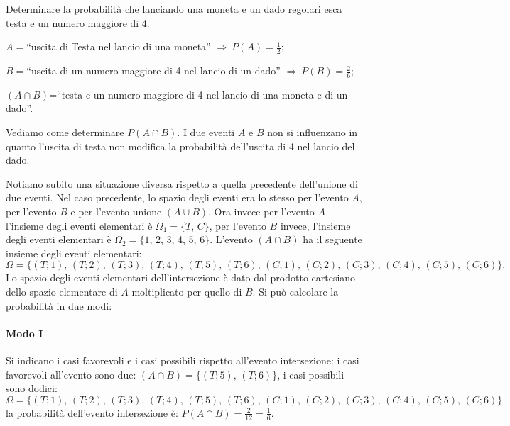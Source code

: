 \begin{exrig}
\begin{esempio}
Determinare la probabilità che lanciando una moneta e un dado regolari esca testa e un numero maggiore di 4.
\begin{description*}
\item $A=$``uscita di Testa nel lancio di una moneta'' $\Rightarrow\: P(A)=\frac 1 2$;
\item $B=$``uscita di un numero maggiore di 4 nel lancio di un dado'' $\Rightarrow\: P(B)=\frac 2 6$;
\item $(A\cap B)$=``testa e un numero maggiore di 4 nel lancio di una moneta e di un dado''.
\end{description*}
Vediamo come determinare $P(A\cap B)$.
I due eventi $A$ e $B$ non si influenzano in quanto l'uscita di testa non modifica la probabilità dell'uscita di 4 nel lancio del dado.

Notiamo subito una situazione diversa rispetto a quella precedente dell'unione di due eventi. Nel caso precedente, lo spazio degli eventi era lo stesso per l'evento $A$, per l'evento $B$ e per l'evento unione $(A\cup B)$.
Ora invece per l'evento $A$ l'insieme degli eventi elementari è $\Omega_1=\{T$, $C\}$, per l'evento $B$ invece, l'insieme degli eventi elementari è $\Omega_2=\{1$, 2, 3, 4, 5, $6\}$. L'evento $(A\cap B)$ ha il seguente insieme degli eventi elementari: \[\Omega=\{(T;1)\text{, }(T;2)\text{, }(T;3)\text{, }(T;4)\text{, }(T;5)\text{, }(T;6)\text{, }(C;1)\text{, }(C;2)\text{, }(C;3)\text{, }(C;4)\text{, }(C;5)\text{, }(C;6)\}. \]
Lo spazio degli eventi elementari dell'intersezione è dato dal prodotto cartesiano dello spazio elementare di $A$ moltiplicato per quello di $B$. Si può calcolare la probabilità in due modi:
\paragraph{Modo I} Si indicano i casi favorevoli e i casi possibili rispetto all'evento intersezione: i casi favorevoli all'evento sono due: $(A\cap B)=\{(T;5)\text{, }(T;6)\}$, i casi possibili sono dodici: \[\Omega=\{(T;1)\text{, }(T;2)\text{, }(T;3)\text{, }(T;4)\text{, }(T;5)\text{, }(T;6)\text{, }(C;1)\text{, }(C;2)\text{, }(C;3)\text{, }(C;4)\text{, }(C;5)\text{, }(C;6)\} \] la probabilità dell'evento intersezione è: $P(A\cap B)=\frac 2{12}=\frac 1 6$.

\begin{center}
 
\end{center}


\end{esempio}
\end{exrig}
